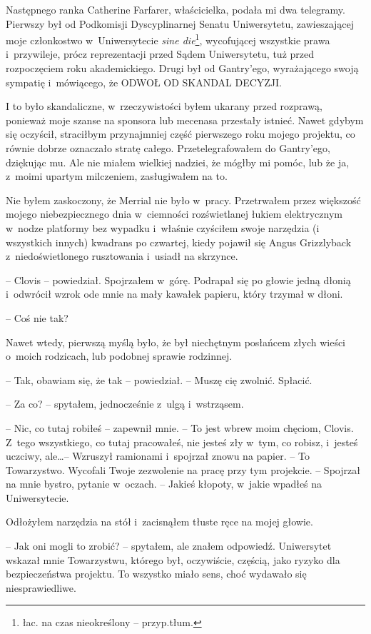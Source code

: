 \documentclass[oneside,polish,11pt,sfheadings]{mwbk}
\begin{document}
Następnego ranka Catherine Farfarer, właścicielka, podała mi dwa
telegramy. Pierwszy był od Podkomisji Dyscyplinarnej Senatu
Uniwersytetu, zawieszającej moje członkostwo w~Uniwersytecie \textit{sine
die}\footnote{ łac. na czas nieokreślony -- przyp.tłum.}, wycofującej
wszystkie prawa i~przywileje, prócz reprezentacji przed Sądem
Uniwersytetu, tuż przed rozpoczęciem roku akademickiego. Drugi był od
Gantry'ego, wyrażającego swoją sympatię i~mówiącego, że ODWOŁ OD SKANDAL
DECYZJI.

I to było skandaliczne, w~rzeczywistości byłem ukarany przed rozprawą,
ponieważ moje szanse na sponsora lub mecenasa przestały istnieć. Nawet
gdybym się oczyścił, straciłbym przynajmniej część pierwszego roku
mojego projektu, co równie dobrze oznaczało stratę całego.
Przetelegrafowałem do Gantry'ego, dziękując mu. Ale nie miałem wielkiej
nadziei, że mógłby mi pomóc, lub że ja, z~moimi upartym milczeniem,
zasługiwałem na to.

Nie byłem zaskoczony, że Merrial nie było w~pracy. Przetrwałem przez
większość mojego niebezpiecznego dnia w~ciemności rozświetlanej łukiem
elektrycznym w~nodze platformy bez wypadku i~właśnie czyściłem swoje
narzędzia (i wszystkich innych) kwadrans po czwartej, kiedy pojawił się
Angus Grizzlyback z~niedoświetlonego rusztowania i~usiadł na skrzynce.

-- Clovis -- powiedział. Spojrzałem w~górę. Podrapał się po głowie jedną
dłonią i~odwrócił wzrok ode mnie na mały kawałek papieru, który trzymał
w dłoni.

-- Coś nie tak?

Nawet wtedy, pierwszą myślą było, że był niechętnym posłańcem złych
wieści o~moich rodzicach, lub podobnej sprawie rodzinnej.

-- Tak, obawiam się, że tak -- powiedział. -- Muszę cię zwolnić. Spłacić.

-- Za co? -- spytałem, jednocześnie z~ulgą i~wstrząsem.

-- Nic, co tutaj robiłeś -- zapewnił mnie. -- To jest wbrew moim chęciom,
Clovis. Z~tego wszystkiego, co tutaj pracowałeś, nie jesteś zły w~tym,
co robisz, i~jesteś uczciwy, ale\ldots -- Wzruszył ramionami i~spojrzał
znowu na papier. -- To Towarzystwo. Wycofali Twoje zezwolenie na pracę
przy tym projekcie. -- Spojrzał na mnie bystro, pytanie w~oczach. -- Jakieś kłopoty, w~jakie wpadłeś na Uniwersytecie.

Odłożyłem narzędzia na stół i~zacisnąłem tłuste ręce na mojej głowie. 

-- Jak oni mogli to zrobić? -- spytałem, ale znałem odpowiedź. Uniwersytet
wskazał mnie Towarzystwu, którego był, oczywiście, częścią, jako
ryzyko dla bezpieczeństwa projektu. To wszystko miało sens, choć
wydawało się niesprawiedliwe.
\end{document}
